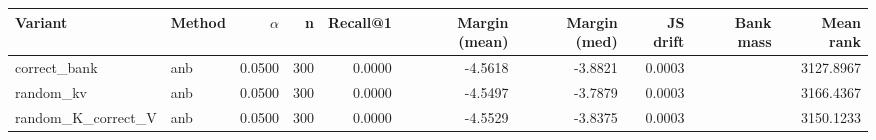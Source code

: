 \begin{tabular}{l l r r r r r r r r}
\toprule
Variant & Method & $\alpha$ & n & Recall@1 & Margin (mean) & Margin (med) & JS drift & Bank mass & Mean rank \\
\midrule
correct\_bank & anb & 0.0500 & 300 & 0.0000 & -4.5618 & -3.8821 & 0.0003 &  & 3127.8967 \\
random\_kv & anb & 0.0500 & 300 & 0.0000 & -4.5497 & -3.7879 & 0.0003 &  & 3166.4367 \\
random\_K\_correct\_V & anb & 0.0500 & 300 & 0.0000 & -4.5529 & -3.8375 & 0.0003 &  & 3150.1233 \\
\bottomrule
\end{tabular}
